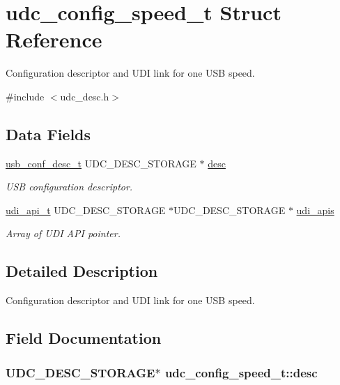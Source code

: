 \hypertarget{structudc__config__speed__t}{
\section{udc\-\_\-config\-\_\-speed\-\_\-t \-Struct \-Reference}
\label{structudc__config__speed__t}
}


\-Configuration descriptor and \-U\-D\-I link for one \-U\-S\-B speed.  




{\ttfamily \#include $<$udc\-\_\-desc.\-h$>$}

\subsection*{\-Data \-Fields}
\begin{DoxyCompactItemize}
\item 
\hyperlink{structusb__conf__desc__t}{usb\-\_\-conf\-\_\-desc\-\_\-t} \-U\-D\-C\-\_\-\-D\-E\-S\-C\-\_\-\-S\-T\-O\-R\-A\-G\-E $\ast$ \hyperlink{structudc__config__speed__t_a2b2dd8b8091a0c4e9b19989a1779c5af}{desc}
\begin{DoxyCompactList}\small\item\em \-U\-S\-B configuration descriptor. \end{DoxyCompactList}\item 
\hyperlink{structudi__api__t}{udi\-\_\-api\-\_\-t} \-U\-D\-C\-\_\-\-D\-E\-S\-C\-\_\-\-S\-T\-O\-R\-A\-G\-E \*
$\ast$\-U\-D\-C\-\_\-\-D\-E\-S\-C\-\_\-\-S\-T\-O\-R\-A\-G\-E $\ast$ \hyperlink{structudc__config__speed__t_a2e343b988012ad9192a133d50eeab703}{udi\-\_\-apis}
\begin{DoxyCompactList}\small\item\em \-Array of \-U\-D\-I \-A\-P\-I pointer. \end{DoxyCompactList}\end{DoxyCompactItemize}


\subsection{\-Detailed \-Description}
\-Configuration descriptor and \-U\-D\-I link for one \-U\-S\-B speed. 

\subsection{\-Field \-Documentation}
\hypertarget{structudc__config__speed__t_a2b2dd8b8091a0c4e9b19989a1779c5af}{
\subsubsection[{desc}]{ \-U\-D\-C\-\_\-\-D\-E\-S\-C\-\_\-\-S\-T\-O\-R\-A\-G\-E$\ast$ {\bf udc\-\_\-config\-\_\-speed\-\_\-t\-::desc}}}
\label{structudc__config__speed__t_a2b2dd8b8091a0c4e9b19989a1779c5af}


